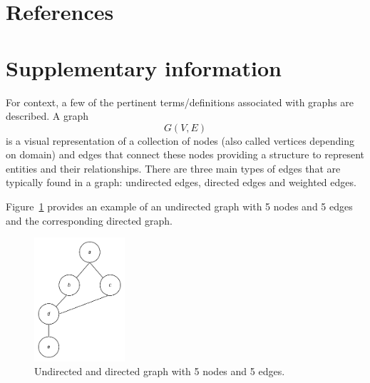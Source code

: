 \documentclass[
  super,
  preprint,
  3p]{elsarticle}
\begin{document}
\section*{References}\label{references}

\renewcommand{\bibsection}{}


\newpage{}

\newpage
\appendix
\renewcommand{\thefigure}{A\arabic{figure}}
\renewcommand{\thetable}{A\arabic{table}}
\setcounter{figure}{0}
\setcounter{table}{0}

\section{Supplementary information}\label{supplementary-information}

For context, a few of the pertinent terms/definitions associated with
graphs are described. A graph \[ G(V, E) \] is a visual representation
of a collection of nodes (also called vertices depending on domain) and
edges that connect these nodes providing a structure to represent
entities and their relationships. There are three main types of edges
that are typically found in a graph: undirected edges, directed edges
and weighted edges.

Figure~\ref{fig-gg} provides an example of an undirected graph with 5
nodes and 5 edges and the corresponding directed graph.

\begin{figure}

\begin{minipage}{\linewidth}

\includegraphics[width=0.3\textwidth,height=\textheight]{fig-gp.png}

\end{minipage}%

\caption{\label{fig-gg}Undirected and directed graph with 5 nodes and 5
edges.}

\end{figure}%
\end{document}

